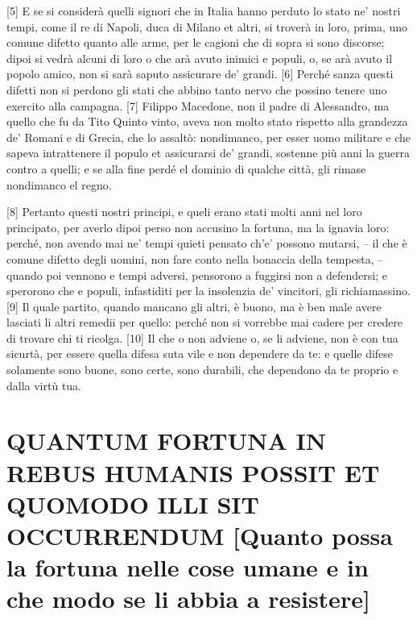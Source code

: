 {[}5{]} E se si considerà quelli signori che in Italia hanno perduto lo
stato ne' nostri tempi, come il re di Napoli, duca di Milano et altri,
si troverà in loro, prima, uno comune difetto quanto alle arme, per le
cagioni che di sopra si sono discorse; dipoi si vedrà alcuni di loro o
che arà avuto inimici e populi, o, se arà avuto il popolo amico, non si
sarà saputo assicurare de' grandi. {[}6{]} Perché sanza questi difetti
non si perdono gli stati che abbino tanto nervo che possino tenere uno
exercito alla campagna. {[}7{]} Filippo Macedone, non il padre di
Alessandro, ma quello che fu da Tito Quinto vinto, aveva non molto stato
rispetto alla grandezza de' Romani e di Grecia, che lo assaltò:
nondimanco, per esser uomo militare e che sapeva intrattenere il populo
et assicurarsi de' grandi, sostenne più anni la guerra contro a quelli;
e se alla fine perdé el dominio di qualche città, gli rimase nondimanco
el regno.

{[}8{]} Pertanto questi nostri principi, e queli erano stati molti anni
nel loro principato, per averlo dipoi perso non accusino la fortuna, ma
la ignavia loro: perché, non avendo mai ne' tempi quieti pensato ch'e'
possono mutarsi, -- il che è comune difetto degli uomini, non fare conto
nella bonaccia della tempesta, -- quando poi vennono e tempi adversi,
pensorono a fuggirsi non a defendersi; e sperorono che e populi,
infastiditi per la insolenzia de' vincitori, gli richiamassino. {[}9{]}
Il quale partito, quando mancano gli altri, è buono, ma è ben male avere
lasciati li altri remedii per quello: perché non si vorrebbe mai cadere
per credere di trovare chi ti ricolga. {[}10{]} Il che o non adviene o,
se li adviene, non è con tua sicurtà, per essere quella difesa suta vile
e non dependere da te: e quelle difese solamente sono buone, sono certe,
sono durabili, che dependono da te proprio e dalla virtù tua.

\quebra\section{QUANTUM FORTUNA IN REBUS HUMANIS POSSIT ET QUOMODO ILLI SIT OCCURRENDUM
{[}Quanto possa la fortuna nelle cose umane e in che modo se li abbia a resistere{]}}

